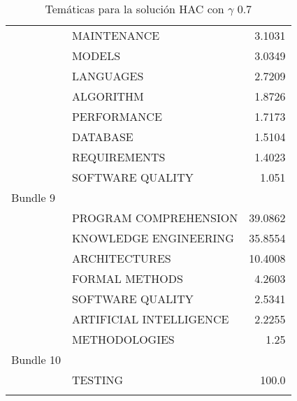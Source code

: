 \begin{center}
\begin{longtable}{|llr|}
 ~ & MAINTENANCE & 3.1031 \\
 ~ & MODELS & 3.0349 \\
 ~ & LANGUAGES & 2.7209 \\
 ~ & ALGORITHM & 1.8726 \\
 ~ & PERFORMANCE & 1.7173 \\
 ~ & DATABASE & 1.5104 \\
 ~ & REQUIREMENTS & 1.4023 \\
 ~ & SOFTWARE QUALITY & 1.051 \\
Bundle 9 & ~ & ~ \\
 ~ & PROGRAM COMPREHENSION & 39.0862 \\
 ~ & KNOWLEDGE ENGINEERING & 35.8554 \\
 ~ & ARCHITECTURES & 10.4008 \\
 ~ & FORMAL METHODS & 4.2603 \\
 ~ & SOFTWARE QUALITY & 2.5341 \\
 ~ & ARTIFICIAL INTELLIGENCE & 2.2255 \\
 ~ & METHODOLOGIES & 1.25 \\
Bundle 10 & ~ & ~ \\
 ~ & TESTING & 100.0 \\
    \hline
  \caption {Temáticas para la solución HAC con $\gamma$ 0.7}
\end{longtable}
\end{center}

